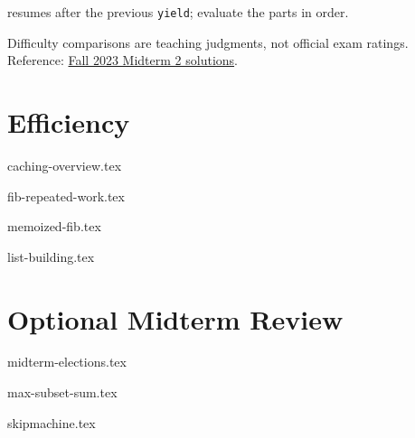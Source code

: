 \documentclass{exam}
\begin{document}
\begin{meta}
\begin{itemize}
    resumes after the previous \lstinline{yield}; evaluate the parts in order.
\end{itemize}
Difficulty comparisons are teaching judgments, not official exam ratings. Reference: \href{https://website.cs61a.org/exam/fa23/mt2/61a-fa23-mt2_sol.pdf}{Fall 2023 Midterm 2 solutions}.
\end{meta}

\section{Efficiency}
\begingroup
{caching-overview.tex}
\endgroup
\begin{questions}
    {fib-repeated-work.tex}

    {memoized-fib.tex}

    {list-building.tex}
\end{questions}

\newpage
\section{Optional Midterm Review}
\begin{questions}
    \setcounter{question}{3}
    {midterm-elections.tex}

    \newpage
    {max-subset-sum.tex}

    \newpage
    {skipmachine.tex}
\end{questions}
\end{document}
